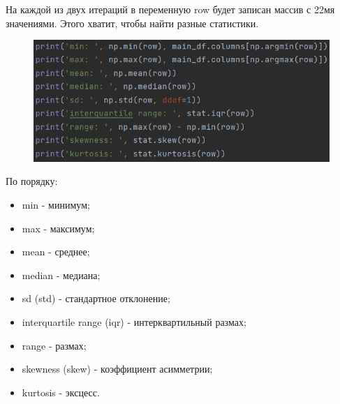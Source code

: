 На каждой из двух итераций в переменную row будет записан массив с 22мя значениями. Этого хватит, чтобы найти разные статистики.

\begin{figure}[H]
	\begin{center}
		\includegraphics{include/fig/describe}
	\end{center}
\end{figure}

По порядку:
\begin{itemize}
	\item min - минимум;
	\item max - максимум;
	\item mean - среднее;
	\item median - медиана;
	\item sd (std) - стандартное отклонение;
	\item interquartile range (iqr) - интерквартильный размах;
	\item range - размах;
	\item skewness (skew) - коэффициент асимметрии;
	\item kurtosis - эксцесс.
\end{itemize}

\newpage

